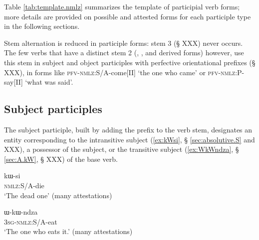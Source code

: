 Table \ref{tab:template.nmlz} summarizes the template of participial verb forms; more details are provided on possible and attested forms for each participle type in the following sections.

\begin{table}[h]
\caption{The template of participial verb forms in Japhug} \centering \label{tab:template.nmlz}
\end{table}

Stem alternation is reduced in participle forms: stem 3 (§ XXX) never occurs. The few verbs that have a distinct stem 2 (, ,  and derived forms) however, use this stem in subject and object participles with perfective orientational prefixes (§ XXX), in forms like  \textsc{pfv}-\textsc{nmlz}:S/A-come[II] `the one who came'
or  \textsc{pfv}-\textsc{nmlz}:P-say[II] `what was said'.
 
\subsection{Subject participles} \label{sec:subject.participles}
The subject participle, built by adding the prefix  to the verb stem, designates an entity corresponding to the intransitive subject (\ref{ex:kWsi}, § \ref{sec:absolutive.S} and XXX), a possessor of the subject, or the transitive subject (\ref{ex:WkWndza}, § \ref{sec:A.kW}, § XXX) of the base verb. 

 \begin{exe}
\ex \label{ex:kWsi}
\gll kɯ-si  \\
  \textsc{nmlz}:S/A-die \\
 \glt  `The dead one' (many attestations)
\end{exe}

 \begin{exe} 
\ex \label{ex:WkWndza}
\gll ɯ-kɯ-ndza \\
  \textsc{3sg}-\textsc{nmlz}:S/A-eat \\
 \glt  `The one who eats it.' (many attestations)
\end{exe}

